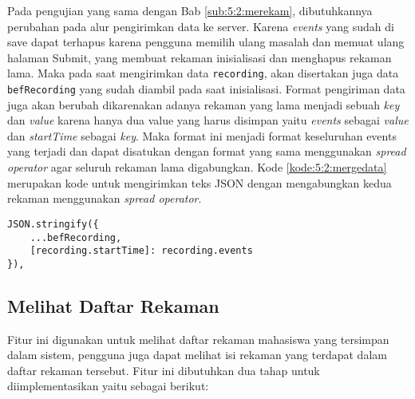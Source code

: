 Pada pengujian yang sama dengan Bab \ref{sub:5:2:merekam}, dibutuhkannya perubahan pada alur pengirimkan data ke server. Karena \textit{events} yang sudah di save dapat terhapus karena pengguna memilih ulang masalah dan memuat ulang halaman Submit, yang membuat rekaman inisialisasi dan menghapus rekaman lama. Maka pada saat mengirimkan data \verb|recording|, akan disertakan juga data \verb|befRecording| yang sudah diambil pada saat inisialisasi. Format pengiriman data juga akan berubah dikarenakan adanya rekaman yang lama menjadi sebuah \textit{key} dan \textit{value} karena hanya dua value yang harus disimpan yaitu \textit{events} sebagai \textit{value} dan \textit{startTime} sebagai \textit{key}. Maka format ini menjadi format keseluruhan events yang terjadi dan dapat disatukan dengan format yang sama menggunakan \textit{spread operator} agar seluruh rekaman lama digabungkan. Kode \ref{kode:5:2:mergedata} merupakan kode untuk mengirimkan teks JSON dengan mengabungkan kedua rekaman menggunakan \textit{spread operator}.

\begin{lstlisting}[caption={objek \textit{callback function}}, label={kode:5:2:mergedata}]
JSON.stringify({
    ...befRecording,
    [recording.startTime]: recording.events
}),
\end{lstlisting}

\subsection{Melihat Daftar Rekaman}

Fitur ini digunakan untuk melihat daftar rekaman mahasiswa yang tersimpan dalam sistem, pengguna juga dapat melihat isi rekaman yang terdapat dalam daftar rekaman tersebut. Fitur ini dibutuhkan dua tahap untuk diimplementasikan yaitu sebagai berikut:

